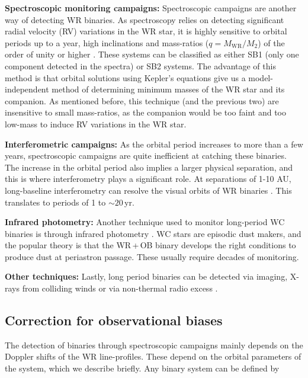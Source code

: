 \textbf{Spectroscopic monitoring campaigns:} Spectroscopic campaigns are another way of detecting WR binaries. As spectroscopy relies on detecting significant radial velocity (RV) variations in the WR star, it is highly sensitive to orbital periods up to a year, high inclinations and mass-ratios ($q=M_\textrm{WR}/M_2$) of the order of unity or higher \citep[see e.g.,][]{1998Marchenko1998WR141,2012David-Uraz,2021Richardson}. These systems can be classified as either SB1 (only one component detected in the spectra) or SB2 systems. The advantage of this method is that orbital solutions using Kepler's equations give us a model-independent method of determining minimum masses of the WR star and its companion. As mentioned before, this technique (and the previous two) are insensitive to small mass-ratios, as the companion would be too faint and too low-mass to induce RV variations in the WR star.

\textbf{Interferometric campaigns:} As the orbital period increases to more than a few years, spectroscopic campaigns are quite inefficient at catching these binaries. The increase in the orbital period also implies a larger physical separation, and this is where interferometry plays a significant role. At separations of 1-10 AU, long-baseline interferometry can resolve the visual orbits of WR binaries \citep[e.g. for WR 113 and WR 140, respectively:][]{2021Richardson,thomas_orbit_2021}. This translates to periods of 1 to ${\sim}20\,$yr.

\textbf{Infrared photometry:} Another technique used to monitor long-period WC binaries is through infrared photometry \citep{1995Williamsdust,1999MarchenkoDust,2001WilliamsDust,2005Williams,2019WilliamsNEOWISE}. WC stars are episodic dust makers, and the popular theory is that the WR\,+\,OB binary develops the right conditions to produce dust at periastron passage. These usually require decades of monitoring.

\textbf{Other techniques:} Lastly, long period binaries can be detected via imaging, X-rays from colliding winds or via non-thermal radio excess \citep[e.g.][]{1996Dougherty, 2000Dougherty, 2017Zhekov,2020Rodriguez, 2020Zhekov}.

\subsection{Correction for observational biases} \label{sect:obs_bias_intro}

The detection of binaries through spectroscopic campaigns mainly depends on the Doppler shifts of the WR line-profiles. These depend on the orbital parameters of the system, which we describe briefly. Any binary system can be defined by

